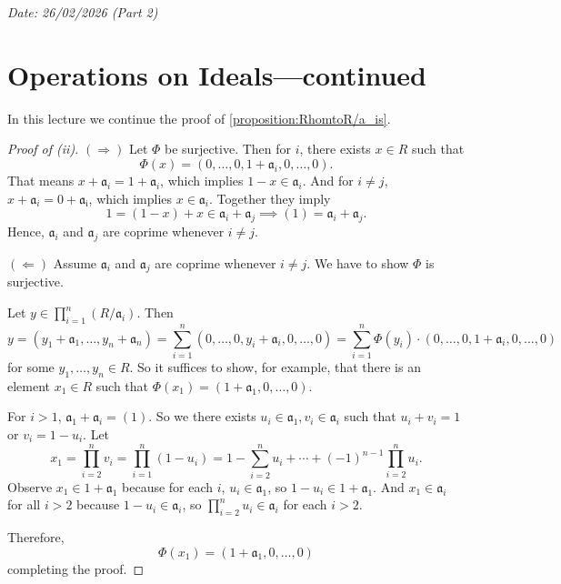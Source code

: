 \hfill {\footnotesize \textit{Date: 26/02/2026 (Part 2)}}

\section{Operations on Ideals---continued}
In this lecture we continue the proof of \autoref{proposition:RhomtoR/a_is}.
\begin{proof}[Proof of (ii)]
    \((\Longrightarrow)\) Let \(\Phi\) be surjective. Then for \(i\), there exists \(x \in R\) such that 
     \[
    \Phi(x) = (0,\ldots, 0, 1+ \mathfrak{a}_i, 0, \ldots, 0).
    \]
    That means \(x + \mathfrak{a}_i = 1 + \mathfrak{a}_i\), which implies \(1 - x \in \mathfrak{a}_i\). And for \(i \neq j\),  \(x + \mathfrak{a}_i = 0 + \mathfrak{a_i}\), which implies \(x \in \mathfrak{a}_i\). Together they imply
    \[
        1 = (1 - x) + x \in \mathfrak{a}_i + \mathfrak{a}_j \implies (1) = \mathfrak{a}_i + \mathfrak{a}_j.
    \]
    Hence, \(\mathfrak{a}_i\) and \(\mathfrak{a}_j\) are coprime whenever \(i \neq j\).

    \((\Longleftarrow)\) Assume \(\mathfrak{a}_i\) and \(\mathfrak{a}_j\) are coprime whenever \(i \neq j\). We have to show  \(\Phi\) is surjective. 

    Let  \(y \in \prod_{i=1}^{n} (R/\mathfrak{a}_i)\). Then
    \[
    y = (y_1 + \mathfrak{a_1}, \ldots, y_n + \mathfrak{a}_n) = \sum_{i=1}^{n} (0, \ldots, 0, y_i + \mathfrak{a}_i, 0, \ldots, 0) = \sum_{i=1}^{n} \Phi(y_i) \cdot (0, \ldots, 0, 1 + \mathfrak{a}_i, 0, \ldots, 0)
    \] for some \(y_1, \ldots, y_n \in R\). So it suffices to show, for example, that there is an element \(x_1 \in R\) such that  \(\Phi(x_1) = (1 + \mathfrak{a}_1, 0, \ldots, 0).\) 

    For \(i > 1\),  \(\mathfrak{a}_1 + \mathfrak{a}_i = (1)\). So we there exists \(u_i \in \mathfrak{a}_1, v_i \in \mathfrak{a}_i\) such that \(u_i + v_i =1\) or  \(v_i = 1 - u_i\). Let 
    \[
        x_1 = \prod_{i=2}^{n} v_i =  \prod_{i=1}^{n} (1 - u_i) = 1 - \sum_{i=2}^{n} u_i + \cdots + (-1)^{n-1} \prod_{i=2}^{n} u_i.
    \] 
    Observe \(x_1 \in 1 + \mathfrak{a}_1\) because for each \(i\), \(u_i \in \mathfrak{a}_1\), so \(1 - u_i \in 1 + \mathfrak{a}_1\). And \(x_1 \in \mathfrak{a}_i\) for all \(i > 2\) because \(1 - u_i \in \mathfrak{a}_i\), so \(\prod_{i=2}^{n} u_i \in \mathfrak{a}_i\) for each \(i > 2\).

Therefore, 
\[
\Phi(x_1) = (1 + \mathfrak{a}_1, 0, \ldots, 0)
\] completing the proof.
\end{proof}
